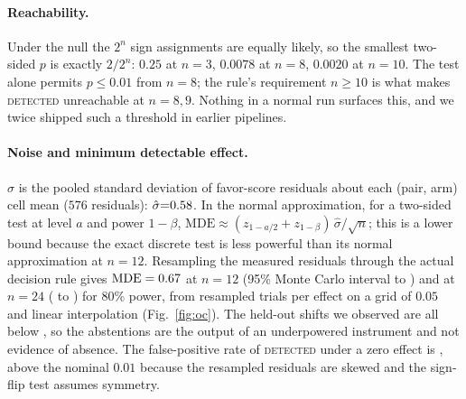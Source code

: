 \documentclass{article}
\begin{document}
\paragraph{Reachability.} Under the null the $2^n$ sign assignments are equally likely, so the smallest two-sided $p$ is exactly $2/2^n$: $0.25$ at
$n{=}3$, $0.0078$ at $n{=}8$, $0.0020$ at $n{=}10$. The test alone permits $p\le0.01$ from $n{=}8$; the rule's requirement $n\ge10$ is what makes
\textsc{detected} unreachable at $n{=}8,9$. Nothing in a normal run surfaces this, and we twice shipped such a threshold in earlier pipelines.

\paragraph{Noise and minimum detectable effect.} $\hat\sigma$ is the pooled standard deviation of favor-score residuals about each (pair, arm)
cell mean ($576$ residuals): $\hat\sigma{=}0.58$. In the normal approximation, for a two-sided test at level $a$ and power $1-\beta$,
$\mathrm{MDE}\approx(z_{1-a/2}+z_{1-\beta})\,\hat\sigma/\sqrt n$; this is a lower bound because the exact discrete test is less powerful than its
normal approximation at $n{=}12$. Resampling the measured residuals through the actual decision rule gives $\mathrm{MDE}=0.67$ at
$n{=}12$ (95\% Monte Carlo interval \mdeTwelveLoA{} to \mdeTwelveHiA) and \mdeTwentyFourA{} at $n{=}24$ (\mdeTwentyFourLoA{} to \mdeTwentyFourHiA) for 80\% power, from \nTrialsA{} resampled trials per effect on a grid of $0.05$ and linear interpolation (Fig.~\ref{fig:oc}). The held-out shifts we observed are
all below \mdeTwelveA{}, so the abstentions are the output of an underpowered instrument and not evidence of absence. The false-positive rate of
\textsc{detected} under a zero effect is \fprNullA{}, above the nominal $0.01$ because the resampled residuals are skewed and the sign-flip test
assumes symmetry.
\end{document}
